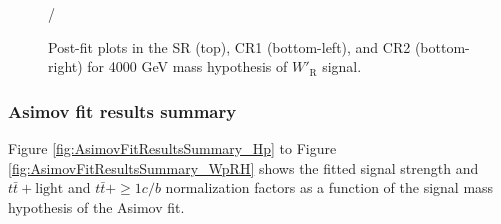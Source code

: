 \begin{figure}[H]
  \centering
  /
  \caption{Post-fit plots in the SR (top), CR1 (bottom-left), and CR2 (bottom-right) for 4000 GeV mass hypothesis of $W'_{\text{R}}$ signal.}
  \label{fig:Postfit_WpRH4000_Asimov}
\end{figure}

\subsubsection{Asimov fit results summary}
\label{subsec:AsimovFitResultSummary}
Figure \ref{fig:AsimovFitResultsSummary_Hp} to Figure \ref{fig:AsimovFitResultsSummary_WpRH} shows the fitted signal strength and $t\bar{t}+\text{light}$ and $t\bar{t}+{\geq}1c/b$ normalization factors as a function of the signal mass hypothesis of the Asimov fit.

